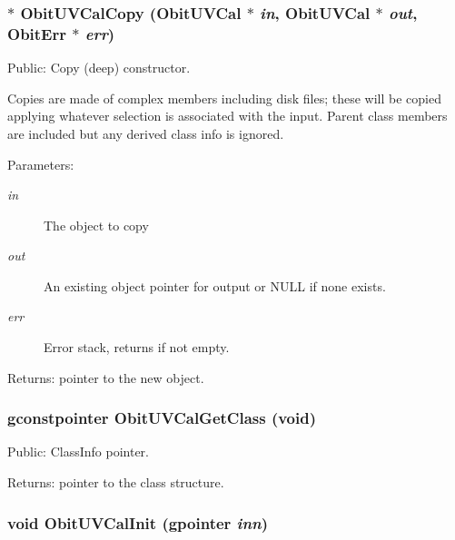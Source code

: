 \subsubsection{$\ast$ Obit\-UVCal\-Copy ({\bf Obit\-UVCal} $\ast$ {\em in}, {\bf Obit\-UVCal} $\ast$ {\em out}, {\bf Obit\-Err} $\ast$ {\em err})}\label{ObitUVCal_8c_a10}


Public: Copy (deep) constructor. 

Copies are made of complex members including disk files; these will be copied applying whatever selection is associated with the input. Parent class members are included but any derived class info is ignored. \begin{Desc}
\item[Parameters:]
\begin{description}
\item[{\em in}]The object to copy \item[{\em out}]An existing object pointer for output or NULL if none exists. \item[{\em err}]Error stack, returns if not empty. \end{description}
\end{Desc}
\begin{Desc}
\item[Returns:]pointer to the new object. \end{Desc}
\subsubsection{\setlength{\rightskip}{0pt plus 5cm}gconstpointer Obit\-UVCal\-Get\-Class (void)}\label{ObitUVCal_8c_a9}


Public: Class\-Info pointer. 

\begin{Desc}
\item[Returns:]pointer to the class structure. \end{Desc}
\subsubsection{\setlength{\rightskip}{0pt plus 5cm}void Obit\-UVCal\-Init (gpointer {\em inn})}\label{ObitUVCal_8c_a3}



